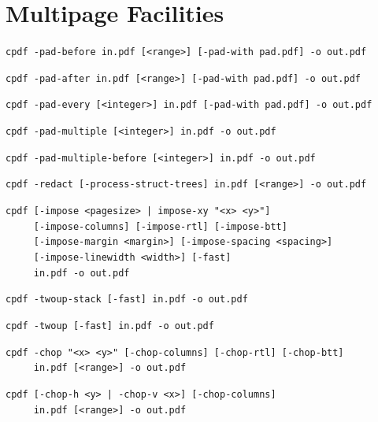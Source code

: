 \documentclass{book}
\begin{document}
\chapter{Multipage Facilities}\pagestyle{fancy}\label{multipage}\label{chap:9}
  \begin{framed}
    \small\noindent\verb!cpdf -pad-before in.pdf [<range>] [-pad-with pad.pdf] -o out.pdf!

    \vspace{1.5mm}
    \small\noindent\verb!cpdf -pad-after in.pdf [<range>] [-pad-with pad.pdf] -o out.pdf!

    \vspace{1.5mm}
    \small\noindent\verb!cpdf -pad-every [<integer>] in.pdf [-pad-with pad.pdf] -o out.pdf!

    \vspace{1.5mm}
    \small\noindent\verb!cpdf -pad-multiple [<integer>] in.pdf -o out.pdf!

    \vspace{1.5mm}
    \small\noindent\verb!cpdf -pad-multiple-before [<integer>] in.pdf -o out.pdf!

    \vspace{1.5mm}
    \small\noindent\verb!cpdf -redact [-process-struct-trees] in.pdf [<range>] -o out.pdf!

    \vspace{1.5mm}
    \small\noindent\verb!cpdf [-impose <pagesize> | impose-xy "<x> <y>"]!\\
    \small\noindent\verb!     [-impose-columns] [-impose-rtl] [-impose-btt]!\\
    \small\noindent\verb!     [-impose-margin <margin>] [-impose-spacing <spacing>]!\\
    \small\noindent\verb!     [-impose-linewidth <width>] [-fast]!\\
    \small\noindent\verb!     in.pdf -o out.pdf!

    \vspace{1.5mm}
    \small\noindent\verb!cpdf -twoup-stack [-fast] in.pdf -o out.pdf! 

    \vspace{1.5mm}
    \small\noindent\verb!cpdf -twoup [-fast] in.pdf -o out.pdf!

    \vspace{1.5mm}
    \small\noindent\verb!cpdf -chop "<x> <y>" [-chop-columns] [-chop-rtl] [-chop-btt]!\\
    \small\noindent\verb!     in.pdf [<range>] -o out.pdf!

    \vspace{1.5mm}
    \small\noindent\verb!cpdf [-chop-h <y> | -chop-v <x>] [-chop-columns]!\\
    \small\noindent\verb!     in.pdf [<range>] -o out.pdf!
  \end{framed}
\end{document}
